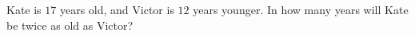 Kate is $17$ years old, and Victor is $12$ years younger. In how many years will Kate be twice as old as Victor?
